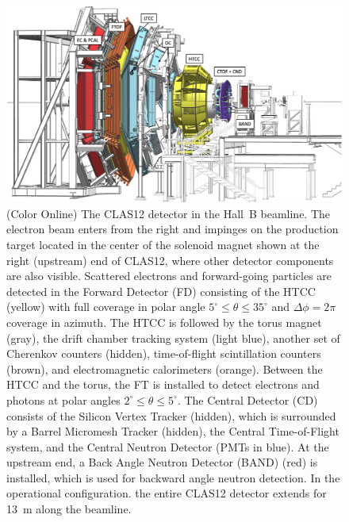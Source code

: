 \documentclass[final,3p,twocolumn]{elsarticle}
\begin{document}
\begin{figure}[t]
\centering
\centerline{\includegraphics[width=1.8\columnwidth]{CLAS12-side.png}}
\caption{(Color Online) The CLAS12 detector in the Hall~B beamline. The electron beam enters from the right and impinges on
the production target located in the center of the solenoid magnet shown at the right (upstream) end of CLAS12,
where other detector components are also visible. Scattered electrons and forward-going particles are detected
in the Forward Detector (FD) consisting of the HTCC (yellow) with full coverage in polar angle
$5^\circ \le \theta \le 35^\circ$ and $\Delta \phi = 2\pi$ coverage in azimuth. The HTCC is followed by the
torus magnet (gray), the drift chamber tracking system (light blue), another set of Cherenkov counters (hidden),
time-of-flight scintillation counters (brown), and electromagnetic calorimeters (orange). Between the HTCC and the
torus, the FT is installed to detect electrons and photons at polar angles $2^\circ \le \theta \le 5^\circ$. The Central
Detector (CD) consists of the Silicon Vertex Tracker (hidden), which is surrounded by a Barrel Micromesh Tracker
(hidden), the Central Time-of-Flight system, and the Central Neutron Detector (PMTs in blue). At the upstream end,
a Back Angle Neutron Detector (BAND) (red) is installed, which is used for backward angle neutron detection. 
In the operational configuration. the entire CLAS12 detector extends for 13~m along the beamline.} 
\label{clas12}
\end{figure}
\end{document}
